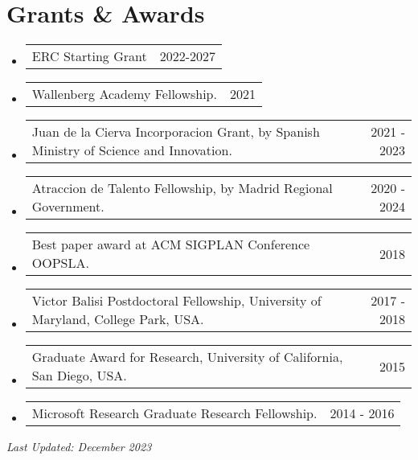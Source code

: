 \documentclass[letterpaper,11pt]{article}
\makeatletter
\newcommand{\resumeProjectHeading}[2]{
    \item
    \begin{tabular*}{0.97\textwidth}{l@{\extracolsep{\fill}}r}
      \small#1 & #2 \\
    \end{tabular*}\vspace{-7pt}
}
\newcommand{\resumeSubHeadingListStart}{\begin{itemize}[leftmargin=0.15in, label={}]}
\newcommand{\resumeSubHeadingListEnd}{\end{itemize}}
\makeatother
\begin{document}
 \section{Grants \& Awards}
 \resumeSubHeadingListStart
 \resumeProjectHeading
     {ERC Starting Grant}{2022-2027}
 \resumeProjectHeading
     {Wallenberg Academy Fellowship.}{2021}
 \resumeProjectHeading
     {Juan de la Cierva Incorporacion Grant, by Spanish Ministry of Science and Innovation.}{2021 - 2023}
 \resumeProjectHeading
     {Atraccion de Talento Fellowship, by Madrid Regional Government.}{2020 - 2024}
 \resumeProjectHeading
     {Best paper award at ACM SIGPLAN Conference OOPSLA.}{2018}
 \resumeProjectHeading
     {Victor Balisi Postdoctoral Fellowship, University of Maryland, College Park, USA.}{2017 - 2018}
 \resumeProjectHeading
     {Graduate Award for Research, University of California, San Diego, USA.}{2015}
 \resumeProjectHeading
     {Microsoft Research Graduate Research Fellowship.}{2014 - 2016}
 \resumeSubHeadingListEnd
 
 \vspace*{\fill}
 \hfill \emph{Last Updated: December 2023}
\end{document}
